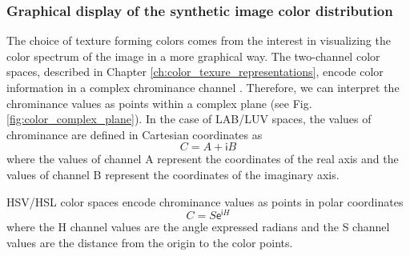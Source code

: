 
\subsubsection{Graphical display of the synthetic image color distribution}
The choice of texture forming colors comes from the interest in visualizing the color spectrum of the image in a more graphical way. The two-channel color spaces, described in Chapter \ref{ch:color_texure_representations}, encode color information in a complex chrominance channel . Therefore, we can interpret the chrominance values as points within a complex plane (see Fig. \ref{fig:color_complex_plane}). In the case of LAB/LUV spaces, the values of chrominance are defined in Cartesian coordinates as 
\begin{equation}\label{eq:chrominance_lab2}
    C = A + \mathsf{i}B
\end{equation}
where the values of channel A represent the coordinates of the real axis and the values of channel B represent the coordinates of the imaginary axis. 

HSV/HSL color spaces encode chrominance values as points in polar coordinates 
\begin{equation}\label{eq:chrominance_hsv2}
    C = S \mathsf{e}^{\mathsf{i}H}
\end{equation}
where the H channel values are the angle expressed radians and the S channel values are the distance from the origin to the color points. 

